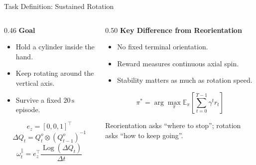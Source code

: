 \documentclass{beamer}
\begin{document}
\begin{frame}{Task Definition: Sustained Rotation}
    \small
    \vspace{0.7em}
    \begin{columns}[T,onlytextwidth]
        \begin{column}{0.46\textwidth}
            \textbf{\textcolor{maincolor}{Goal}}
            \begin{itemize}
                \item Hold a cylinder inside the hand.
                \item Keep rotating around the vertical axis.
                \item Survive a fixed $20\,\mathrm{s}$ episode.
            \end{itemize}

            \vspace{0.25em}
            \[
                e_z = [0,0,1]^\top
            \]
            \[
                \Delta Q_t
                =
                Q_t^o \otimes (Q_{t-1}^o)^{-1}
            \]
            \[
                \omega_t^{\parallel}
                =
                e_z^\top
                \frac{\operatorname{Log}(\Delta Q_t)}{\Delta t}
            \]
        \end{column}
        \begin{column}{0.50\textwidth}
            \textbf{\textcolor{maincolor}{Key Difference from Reorientation}}
            \begin{itemize}
                \item No fixed terminal orientation.
                \item Reward measures continuous axial spin.
                \item Stability matters as much as rotation speed.
            \end{itemize}

            \vspace{0.35em}
            \[
                \pi^\ast
                =
                \arg\max_\pi
                \mathbb{E}_{\pi}
                \left[
                \sum_{t=0}^{T-1}
                \gamma^t r_t
                \right]
            \]

            \vspace{0.2em}
            \centering
            \textcolor{maincolor}{Reorientation asks ``where to stop''; rotation asks ``how to keep going''.}
        \end{column}
    \end{columns}
\end{frame}
\end{document}
